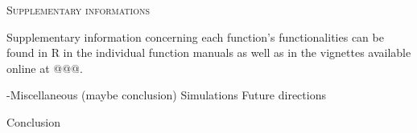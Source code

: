 \documentclass[12pt,letterpaper]{article}
\renewcommand{\section}[1]{%
\bigskip
\begin{center}
\begin{Large}
\normalfont\scshape #1
\medskip
\end{Large}
\end{center}}
\renewcommand{\subsection}[1]{%
\bigskip
\begin{center}
\begin{large}
\normalfont\itshape #1
\end{large}
\end{center}}
\renewcommand{\subsubsection}[1]{%
\vspace{2ex}
\noindent
\textit{#1.}---}
\newcommand{\disp}{\texttt{dispRity} }
\begin{document}





\section{Supplementary informations}
Supplementary information concerning each function's functionalities can be found in R in the individual function manuals as well as in the vignettes available online at @@@.


-Miscellaneous (maybe conclusion)
Simulations
Future directions




Conclusion














\end{document}
